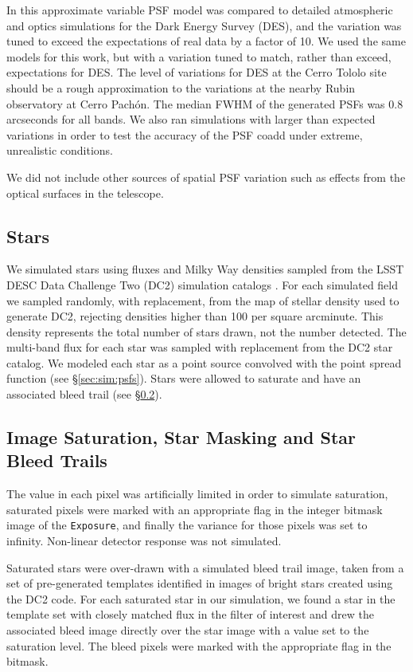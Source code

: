 \documentclass[twocolumn,twocolappendix,astrosym]{openjournal}
\newcommand{\calexp}{\texttt{Exposure}}
\begin{document}
In \citet{mdet20} this approximate variable PSF model was compared to detailed
atmospheric and optics simulations for the Dark Energy Survey (DES), and the
variation was tuned to exceed the expectations of real data by a factor of 10.
We used the same models for this work, but with a variation tuned to match,
rather than exceed, expectations for DES.  The level of variations for DES at
the Cerro Tololo site should be a rough approximation to the variations at the
nearby Rubin observatory at Cerro Pachón.  The median FWHM of the generated
PSFs was 0.8 arcseconds for all bands.  We also ran simulations with larger
than expected variations in order to test the accuracy of the PSF coadd under
extreme, unrealistic conditions.

We did not include other sources of spatial PSF variation such as effects from
the optical surfaces in the telescope.

\subsection{Stars} \label{sec:sim:stars}

We simulated stars using fluxes and Milky Way densities sampled from the LSST
DESC Data Challenge Two (DC2) simulation catalogs \citep{DC2Abolfathi2021}.
For each simulated field we sampled randomly, with replacement, from the map of
stellar density used to generate DC2, rejecting densities higher than 100 per
square arcminute.  This density represents the total number of stars drawn, not
the number detected.  The multi-band flux for each star was sampled with
replacement from the DC2 star catalog.  We modeled each star as a point
source convolved with the point spread function
(see \S \ref{sec:sim:psfs}).  Stars were allowed to saturate and have an
associated bleed trail (see \S \ref{sec:sim:satbleeds}).

\subsection{Image Saturation, Star Masking and Star Bleed Trails} \label{sec:sim:satbleeds}

The value in each pixel was artificially limited in order to simulate
saturation, saturated pixels were marked with an appropriate flag in the
integer bitmask image of the \calexp, and finally the variance for those
pixels was set to infinity.  Non-linear detector response was not simulated.

Saturated stars were over-drawn with a simulated bleed trail image, taken from
a set of pre-generated templates identified in images of bright stars created
using the DC2 code.  For each saturated star in our simulation, we found a star
in the template set with closely matched flux in the filter of interest and
drew the associated bleed image directly over the star image with a value set
to the saturation level.  The bleed pixels were marked with the appropriate
flag in the bitmask.
\end{document}

